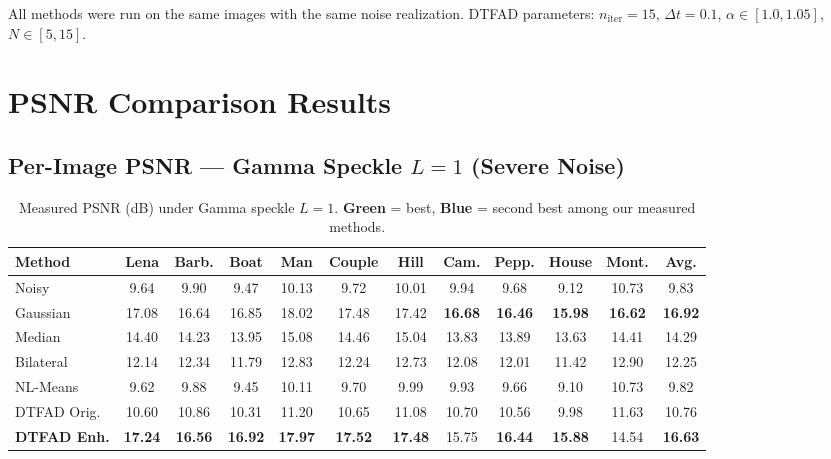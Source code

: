 \documentclass[12pt,a4paper]{article}
\newcommand{\best}[1]{\textcolor{bestgreen}{\textbf{#1}}}
\newcommand{\second}[1]{\textcolor{secondbest}{\textbf{#1}}}
\begin{document}
All methods were run on the same images with the same noise realization. DTFAD parameters: $n_{\text{iter}}=15$, $\Delta t=0.1$, $\alpha \in [1.0, 1.05]$, $N \in [5, 15]$.

\section{PSNR Comparison Results}

\subsection{Per-Image PSNR — Gamma Speckle $L=1$ (Severe Noise)}

\begin{table}[H]
\centering
\caption{Measured PSNR (dB) under Gamma speckle $L=1$. \textcolor{bestgreen}{\textbf{Green}} = best, \textcolor{secondbest}{\textbf{Blue}} = second best among our measured methods.}
\label{tab:psnr_L1_measured}
\small
\setlength{\tabcolsep}{3pt}
\begin{tabular}{l*{10}{c}|c}
\toprule
\textbf{Method} & \textbf{Lena} & \textbf{Barb.} & \textbf{Boat} & \textbf{Man} & \textbf{Couple} & \textbf{Hill} & \textbf{Cam.} & \textbf{Pepp.} & \textbf{House} & \textbf{Mont.} & \textbf{Avg.} \\
\midrule
\rowcolor{lightblue!30}
Noisy & 9.64 & 9.90 & 9.47 & 10.13 & 9.72 & 10.01 & 9.94 & 9.68 & 9.12 & 10.73 & 9.83 \\
\midrule
Gaussian & 17.08 & 16.64 & 16.85 & 18.02 & 17.48 & 17.42 & \best{16.68} & \second{16.46} & \second{15.98} & \best{16.62} & \second{16.92} \\
Median & 14.40 & 14.23 & 13.95 & 15.08 & 14.46 & 15.04 & 13.83 & 13.89 & 13.63 & 14.41 & 14.29 \\
Bilateral & 12.14 & 12.34 & 11.79 & 12.83 & 12.24 & 12.73 & 12.08 & 12.01 & 11.42 & 12.90 & 12.25 \\
NL-Means & 9.62 & 9.88 & 9.45 & 10.11 & 9.70 & 9.99 & 9.93 & 9.66 & 9.10 & 10.73 & 9.82 \\
DTFAD Orig. & 10.60 & 10.86 & 10.31 & 11.20 & 10.65 & 11.08 & 10.70 & 10.56 & 9.98 & 11.63 & 10.76 \\
\textbf{DTFAD Enh.} & \best{17.24} & \best{16.56} & \best{16.92} & \best{17.97} & \best{17.52} & \best{17.48} & 15.75 & \best{16.44} & \best{15.88} & 14.54 & \best{16.63} \\
\bottomrule
\end{tabular}
\end{table}
\end{document}
